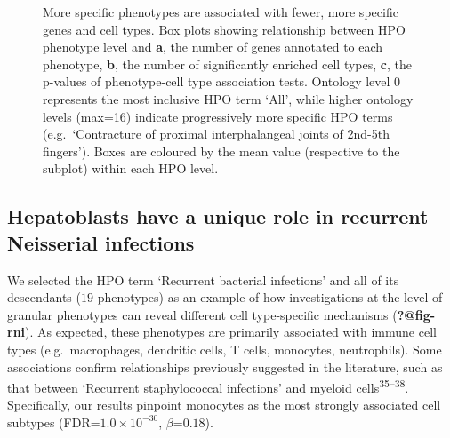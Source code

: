 \documentclass[
]{report}
\begin{document}
\begin{figure}[H]


\caption{\label{fig-ontology-lvlD08295A6-16DC-499D-85A8-8BA656E013A2}More
specific phenotypes are associated with fewer, more specific genes and
cell types. Box plots showing relationship between HPO phenotype level
and \textbf{a}, the number of genes annotated to each phenotype,
\textbf{b}, the number of significantly enriched cell types, \textbf{c},
the p-values of phenotype-cell type association tests. Ontology level 0
represents the most inclusive HPO term `All', while higher ontology
levels (max=16) indicate progressively more specific HPO terms
(e.g.~`Contracture of proximal interphalangeal joints of 2nd-5th
fingers'). Boxes are coloured by the mean value (respective to the
subplot) within each HPO level.}

\end{figure}%

\subsection{Hepatoblasts have a unique role in recurrent Neisserial
infections}\label{hepatoblasts-have-a-unique-role-in-recurrent-neisserial-infections}

We selected the HPO term `Recurrent bacterial infections' and all of its
descendants (\(19\) phenotypes) as an example of how investigations at
the level of granular phenotypes can reveal different cell type-specific
mechanisms (\textbf{?@fig-rni}). As expected, these phenotypes are
primarily associated with immune cell types (e.g.~macrophages, dendritic
cells, T cells, monocytes, neutrophils). Some associations confirm
relationships previously suggested in the literature, such as that
between `Recurrent staphylococcal infections' and myeloid
cells\textsuperscript{35--38}. Specifically, our results pinpoint
monocytes as the most strongly associated cell subtypes
(FDR=\(1.0 \times 10^{-30}\), \(\beta\)=\(0.18\)).
\end{document}
